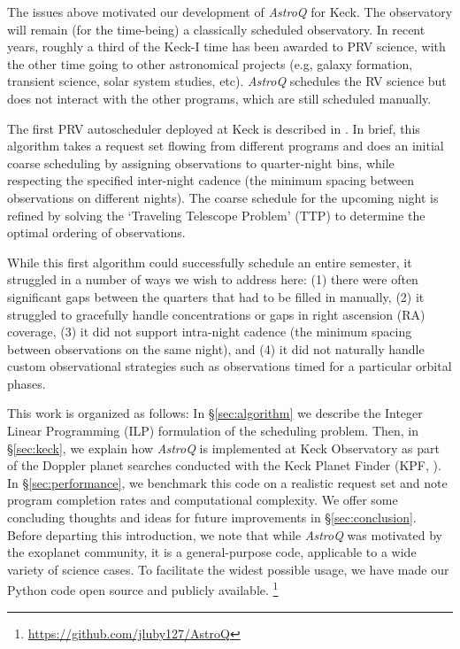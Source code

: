 \documentclass[twocolumn,linenumbers]{aastex63}
\newcommand{\AstroQ}{\textit{AstroQ}\xspace}
\begin{document}
The issues above motivated our development of \AstroQ for Keck. The observatory will remain (for the time-being) a classically scheduled observatory. In recent years, roughly a third of the Keck-I time has been awarded to PRV science, with the other time going to other astronomical projects (e.g, galaxy formation, transient science, solar system studies, etc). \AstroQ schedules the RV science but does not interact with the other programs, which are still scheduled manually.

The first PRV autoscheduler deployed at Keck is described in \citet{Handley2024_Semester}. In brief, this algorithm takes a request set flowing from different programs and does an initial coarse scheduling by assigning observations to quarter-night bins, while respecting the specified inter-night cadence (the minimum spacing between observations on different nights). The coarse schedule for the upcoming night is refined by solving the `Traveling Telescope Problem' (TTP) \cite{Handley2024_TTP} to determine the optimal ordering of observations. 

While this first algorithm could successfully schedule an entire semester, it struggled in a number of ways we wish to address here: (1) there were often significant gaps between the quarters that had to be filled in manually, (2) it struggled to gracefully handle concentrations or gaps in right ascension (RA) coverage, (3) it did not support intra-night cadence (the minimum spacing between observations on the same night), and (4) it did not naturally handle custom observational strategies such as observations timed for a particular orbital phases. 

This work is organized as follows: In \S\ref{sec:algorithm} we describe the Integer Linear Programming (ILP) formulation of the scheduling problem. Then, in \S\ref{sec:keck}, we explain how \AstroQ is implemented at Keck Observatory as part of the Doppler planet searches conducted with the Keck Planet Finder (KPF, \citealt{Gibson24}). In \S\ref{sec:performance}, we benchmark this code on a realistic request set and note program completion rates and computational complexity. We offer some concluding thoughts and ideas for future improvements in \S\ref{sec:conclusion}. Before departing this introduction, we note that while \AstroQ was motivated by the exoplanet community, it is a general-purpose code, applicable to a wide variety of science cases. To facilitate the widest possible usage, we have made our Python code open source and publicly available.%
%
\footnote{\url{https://github.com/jluby127/AstroQ}} 
%
\end{document}
